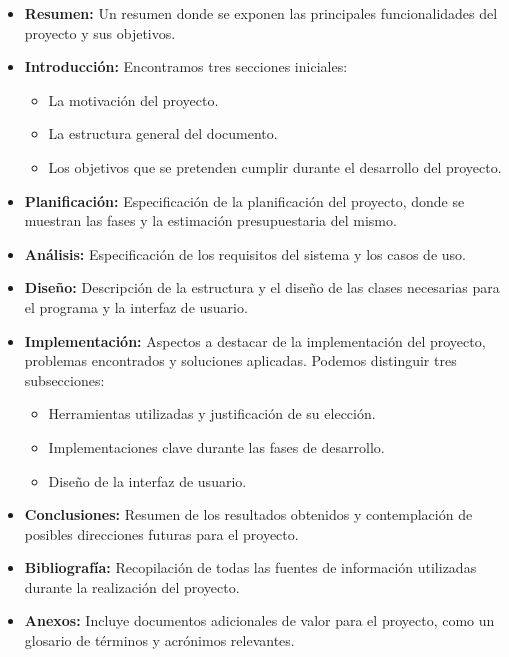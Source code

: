 \begin{itemize}
	\item \textbf{Resumen:} Un resumen donde se exponen las principales funcionalidades del proyecto y sus objetivos. 
	
	\item \textbf{Introducción:} Encontramos tres secciones iniciales: 
	\begin{itemize}
		\item La motivación del proyecto.
		\item La estructura general del documento.
		\item Los objetivos que se pretenden cumplir durante el desarrollo del proyecto.
	\end{itemize}
	
	\item \textbf{Planificación:} Especificación de la planificación del proyecto, donde se muestran las fases y la estimación presupuestaria del mismo. 
	
	\item \textbf{Análisis:} Especificación de los requisitos del sistema y los casos de uso. 
	
	\item \textbf{Diseño:} Descripción de la estructura y el diseño de las clases necesarias para el programa y la interfaz de usuario.
	
	\item \textbf{Implementación:} Aspectos a destacar de la implementación del proyecto, problemas encontrados y soluciones aplicadas. Podemos distinguir tres subsecciones: 
	\begin{itemize}
		\item Herramientas utilizadas y justificación de su elección.
		\item Implementaciones clave durante las fases de desarrollo.
		\item Diseño de la interfaz de usuario.
	\end{itemize}
	
	\item \textbf{Conclusiones:} Resumen de los resultados obtenidos y contemplación de posibles direcciones futuras para el proyecto.
	
	\item \textbf{Bibliografía:} Recopilación de todas las fuentes de información utilizadas durante la realización del proyecto.
	
	\item \textbf{Anexos:} Incluye documentos adicionales de valor para el proyecto, como un glosario de términos y acrónimos relevantes.
\end{itemize}
\newpage





